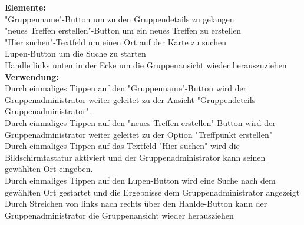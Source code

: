 \textbf{Elemente:}\\
"Gruppenname"-Button um zu den Gruppendetails zu gelangen\\
"neues Treffen erstellen"-Button um ein neues Treffen zu erstellen\\
"Hier suchen"-Textfeld um einen Ort auf der Karte zu suchen\\
Lupen-Button um die Suche zu starten\\
Handle links unten in der Ecke um die Gruppenansicht wieder herauszuziehen\\
\textbf{Verwendung:}\\
Durch einmaliges Tippen auf den "Gruppenname"-Button wird der Gruppenadministrator weiter geleitet zu der Ansicht "Gruppendeteils Gruppenadministrator".\\
Durch einmaliges Tippen auf den "neues Treffen erstellen"-Button wird der Gruppenadministrator weiter geleitet zu der Option "Treffpunkt erstellen"\\
Durch einmaliges Tippen auf das Textfeld "Hier suchen" wird die Bildschirmtastatur aktiviert und der Gruppenadministrator kann seinen gewählten Ort eingeben.\\
Durch einmaliges Tippen auf den Lupen-Button wird eine Suche nach dem gewählten Ort gestartet und die Ergebnisse dem Gruppenadministrator angezeigt\\
Durch Streichen von links nach rechts über den Hanlde-Button kann der Gruppenadministrator die Gruppenansicht wieder herausziehen\\ \\

